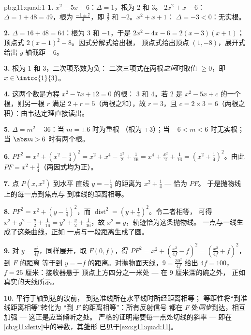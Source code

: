 \begin{solution}{pb:g11:quad:1}
\textbf{1.} $x^2 - 5x + 6$：$\Delta = 1$，根为 $2$ 和 $3$。
$2x^2 + x - 6$：$\Delta = 1 + 48 = 49$，根为
$\frac{-1 \pm 7}{4}$，即 $\frac32$ 和 $-2$。$x^2 + x + 1$：
$\Delta = -3 < 0$：无实根。

\textbf{2.} $\Delta = 16 + 48 = 64$：根为 $3$ 和 $-1$，于是
$2x^2 - 4x - 6 = 2(x - 3)(x + 1)$；顶点式
$2(x - 1)^2 - 8$。因式分解式给出根，
顶点式给出顶点 $(1, -8)$，展开式给出
$y$ 轴截距 $-6$。

\textbf{3.} 根为 $1$ 和 $3$，二次项系数为负：
二次三项式在两根\emph{之间}时取值 $\geq 0$，即
$x \in \intcc{1}{3}$。

\textbf{4.} 这两个数是方程 $x^2 - 7x + 12 = 0$ 的根：
$3$ 和 $4$。若 $2$ 是 $x^2 - 5x + c$ 的一个根，则另一根
$r$ 满足 $2 + r = 5$（两根之和），故 $r = 3$，且
$c = 2 \times 3 = 6$（两根之积）：由韦达定理直接读出。

\textbf{5.} $\Delta = m^2 - 36$：当 $m = \pm 6$ 时为重根
（根为 $\mp 3$）；当 $-6 < m < 6$ 时无实根；当
$\abs m > 6$ 时有两个根。

\textbf{6.} $PF^2 = x^2 + \left(x^2 - \frac14\right)^2
= x^2 + x^4 - \frac{x^2}{2} + \frac{1}{16}
= x^4 + \frac{x^2}{2} + \frac{1}{16}
= \left(x^2 + \frac14\right)^2$。由此
$PF = x^2 + \frac14$（两因式均为正）。

\textbf{7.} 点 $P(x, x^2)$ 到水平
直线 $y = -\frac14$ 的距离为 $x^2 + \frac14$ --- 恰为 $PF$。
于是抛物线上的每一点到焦点与
到准线的距离相等。

\textbf{8.} $PF^2 = x^2 + \left(y - \frac14\right)^2$，而
$\operatorname{dist}^2 = \left(y + \frac14\right)^2$。令二者相等，
可得 $x^2 + y^2 - \frac y2 + \frac{1}{16} = y^2 + \frac y2 +
\frac1{16}$，故 $x^2 = y$，轨迹恰为这条抛物线。
一点与一线生成了这条曲线，正如
一点与一段距离生成了圆。

\textbf{9.} 对 $y = \frac{x^2}{4f}$，同样展开，取
$F(0, f)$，得 $PF^2 = x^2 + \left(\frac{x^2}{4f} - f\right)^2
= \left(\frac{x^2}{4f} + f\right)^2$，到 $F$ 的距离
等于到 $y = -f$ 的距离。对抛物面天线，$9 = \frac{30^2}{4f}$ 给出
$4f = 100$，$f = 25$ 厘米：接收器悬于
顶点上方四分之一米处 --- 在 $9$ 厘米深的碗之外，
正如真实的天线所示。

\textbf{10.} 平行于轴到达的波前，
到达准线所在水平线时所经距离相等；
等距性将“到准线距离相等”转化为
“到 $F$ 的距离相等”：所有反射信号
都在 $F$ 处\emph{同步}到达，相互加强 --- 这正是应当倾听之处。
严格的证明需要每一点处切线的斜率 ---
即在\cref{ch:g11:deriv}中的导数，其雏形
已见于\cref{exo:g11:quad:11}。


\end{solution}
